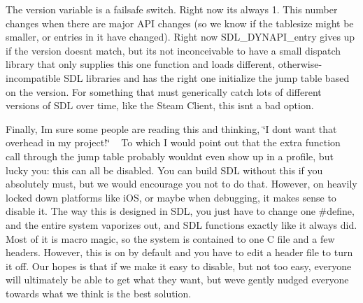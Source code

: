 The version variable is a failsafe switch. Right now it\textquotesingle{}s always 1. This number changes when there are major A\+PI changes (so we know if the tablesize might be smaller, or entries in it have changed). Right now S\+D\+L\+\_\+\+D\+Y\+N\+A\+P\+I\+\_\+entry gives up if the version doesn\textquotesingle{}t match, but it\textquotesingle{}s not inconceivable to have a small dispatch library that only supplies this one function and loads different, otherwise-\/incompatible S\+DL libraries and has the right one initialize the jump table based on the version. For something that must generically catch lots of different versions of S\+DL over time, like the Steam Client, this isn\textquotesingle{}t a bad option.

Finally, I\textquotesingle{}m sure some people are reading this and thinking, \char`\"{}\+I don\textquotesingle{}t want that overhead in my project!\char`\"{} ~\newline
 To which I would point out that the extra function call through the jump table probably wouldn\textquotesingle{}t even show up in a profile, but lucky you\+: this can all be disabled. You can build S\+DL without this if you absolutely must, but we would encourage you not to do that. However, on heavily locked down platforms like i\+OS, or maybe when debugging, it makes sense to disable it. The way this is designed in S\+DL, you just have to change one \#define, and the entire system vaporizes out, and S\+DL functions exactly like it always did. Most of it is macro magic, so the system is contained to one C file and a few headers. However, this is on by default and you have to edit a header file to turn it off. Our hopes is that if we make it easy to disable, but not too easy, everyone will ultimately be able to get what they want, but we\textquotesingle{}ve gently nudged everyone towards what we think is the best solution. 